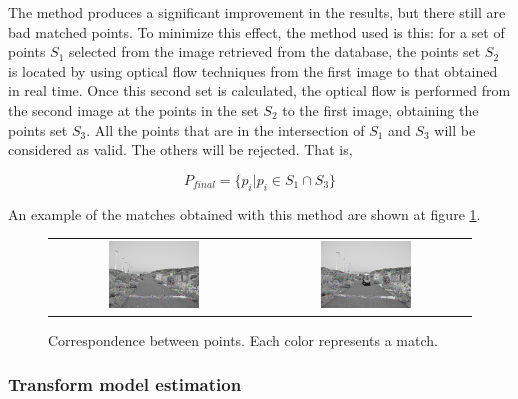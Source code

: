The \cite{bouguet2001pyramidal} method produces a significant improvement in the results, but there still are bad matched points. To minimize this effect, the method used is this: for a set of points $S_1$ selected from the image retrieved from the database, the points set $S_2$ is located by using optical flow techniques from the first image to that obtained in real time. Once this second set is calculated, the optical flow is performed from the second image at the points in the set $S_2$ to the first image, obtaining the points set $S_3$. All the points that are in the intersection of $S_1$ and $S_3$ will be considered as valid. The others will be rejected. That is,

\begin{equation}\label{eq:cp02_rejected_points}
P_{final} = \{ p_i | p_i \in S_1 \cap S_3 \}
\end{equation}

An example of the matches obtained with this method are shown at figure \ref{fig:cp02_matches}.

\begin{figure}[h!]
\begin{tabular}{cc}
\includegraphics[width=0.45\textwidth]{matches1}\label{fig:cp02_matches_1} &
\includegraphics[width=0.45\textwidth]{matches2}\label{fig:cp02_matches_2}
\end{tabular}
\caption{Correspondence between points. Each color represents a match.}\label{fig:cp02_matches}
\end{figure}

\subsubsection{Transform model estimation}\label{ch:chapter02_01_02_03}

